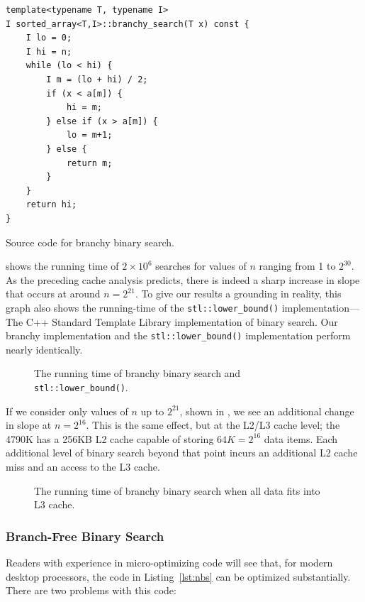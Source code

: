 \documentclass{patmorin}
\newcommand{\lstlabel}[1]{\label{lst:#1}}
\newcommand{\lstref}[1]{Listing~\ref{lst:#1}}
\begin{document}
\begin{listing}
\begin{verbatim}
template<typename T, typename I>
I sorted_array<T,I>::branchy_search(T x) const {
    I lo = 0;
    I hi = n;
    while (lo < hi) {
        I m = (lo + hi) / 2;
        if (x < a[m]) {
            hi = m;
        } else if (x > a[m]) {
            lo = m+1;
        } else {
            return m;
        }
    }
    return hi;
}
\end{verbatim}
\caption{Source code for branchy binary search.}
\lstlabel{nbs}
\end{listing}


 shows the running time of $2\times 10^6$ searches
for values of $n$ ranging from 1 to $2^{30}$. As the preceding cache analysis
predicts, there is indeed a sharp increase in slope that occurs at around
$n=2^{21}$.  To give our results a grounding in reality, this graph
also shows the running-time of the \texttt{stl::lower_bound()}
implementation---The C++ Standard Template Library implementation
of binary search.  Our branchy implementation and the
\texttt{stl::lower_bound()} implementation perform nearly
identically.


\begin{figure}
   \caption{The running time of branchy binary search and 
            \texttt{stl::lower_bound()}.}
\end{figure}

If we consider only values of $n$ up to $2^{21}$, shown in
, we see an additional change in slope at
$n=2^{16}$.  This is the same effect, but at the L2/L3 cache level; the
4790K has a 256KB L2 cache capable of storing $64K=2^{16}$ data items.
Each additional level of binary search beyond that point incurs an
additional L2 cache miss and an access to the L3 cache.

\begin{figure}
   \caption{The running time of branchy binary search when all data
    fits into L3 cache.}
\end{figure}


\subsubsection{Branch-Free Binary Search}

Readers with experience in micro-optimizing code will see that, for
modern desktop processors, the code in \lstref{nbs} can be optimized
substantially.  There are two problems with this code:
\end{document}
